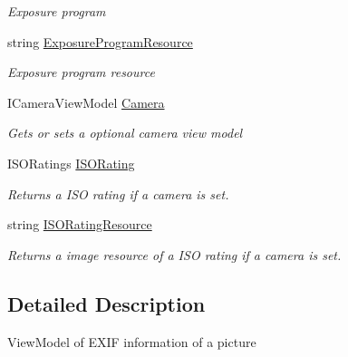 \begin{DoxyCompactItemize}
\begin{DoxyCompactList}\small\item\em Exposure program \end{DoxyCompactList}\item 
string \mbox{\hyperlink{class_pic_d_b_1_1_models_1_1_e_x_i_f_view_model_a7eb1bc06a62d1affe93c0c8f954bad43}{Exposure\+Program\+Resource}}
\begin{DoxyCompactList}\small\item\em Exposure program resource \end{DoxyCompactList}\item 
I\+Camera\+View\+Model \mbox{\hyperlink{class_pic_d_b_1_1_models_1_1_e_x_i_f_view_model_a418a4be3da83feee2bd380e7be4889f9}{Camera}}
\begin{DoxyCompactList}\small\item\em Gets or sets a optional camera view model \end{DoxyCompactList}\item 
I\+S\+O\+Ratings \mbox{\hyperlink{class_pic_d_b_1_1_models_1_1_e_x_i_f_view_model_a94d302c91f95db05563d68c29f3ad62e}{I\+S\+O\+Rating}}
\begin{DoxyCompactList}\small\item\em Returns a I\+SO rating if a camera is set. \end{DoxyCompactList}\item 
string \mbox{\hyperlink{class_pic_d_b_1_1_models_1_1_e_x_i_f_view_model_aa86eeaa06116c385fcb2258d5ed1546c}{I\+S\+O\+Rating\+Resource}}
\begin{DoxyCompactList}\small\item\em Returns a image resource of a I\+SO rating if a camera is set. \end{DoxyCompactList}\end{DoxyCompactItemize}


\subsection{Detailed Description}
View\+Model of E\+X\+IF information of a picture 



